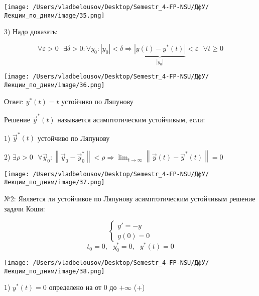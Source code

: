 \documentclass[12pt, a4paper]{report}
\begin{document}
\begin{center}
    \texttt{[image: /Users/vladbelousov/Desktop/Semestr\_4-FP-NSU/ДфУ/Лекции\_по\_дням/image/35.png]}
\end{center}

3) Надо доказать: 

\[ \forall  \varepsilon > 0 \text{ }  \exists  \delta > 0 : \forall  y_0 : \left\lvert y_0  \right\rvert < \delta \Rightarrow\underbrace{ \left\lvert  y(t) - y^* (t )  \right\rvert}_{|y_0|} < \varepsilon \text{ } \forall  t \ge 0 \] 

\begin{center}
    \texttt{[image: /Users/vladbelousov/Desktop/Semestr\_4-FP-NSU/ДфУ/Лекции\_по\_дням/image/36.png]}
\end{center}

Ответ: \( y^* (t ) = t  \)  устойчиво по Ляпунову

\begin{definition}
    Решение \( \vec{y } ^* (t )  \) называется асимптотическим устойчивым, если: 

    1) \( \vec{y } ^* (t )  \) устойчиво по Ляпунову 

    2) \( \exists  \rho > 0 \text{ }  \forall  \vec{y } _0 : \left\lVert \vec{y } _ 0 - \vec{y }  ^* _0  \right\rVert < \rho \displaystyle \Rightarrow \lim_{t     \to \infty} \left\lVert \vec{y } (t ) - \vec{y}  ^* (t ) \right\rVert = 0  \) 

    \begin{center}
        \texttt{[image: /Users/vladbelousov/Desktop/Semestr\_4-FP-NSU/ДфУ/Лекции\_по\_дням/image/37.png]}
    \end{center}
\end{definition}

№2: Является ли устойчивое по Ляпунову асимптотическим устойчивым решение задачи Коши: 

\[ \begin{cases}
y ' = - y \\ 
y(0 )=  0
\end{cases} \] 
\[ t_0 = 0 , \text{ }  y_0 ^{* }  = 0  , \text{ }  y^{* }  (t ) = 0 \] 

\begin{center}
    \texttt{[image: /Users/vladbelousov/Desktop/Semestr\_4-FP-NSU/ДфУ/Лекции\_по\_дням/image/38.png]}
\end{center}

1) \( y^{* } (t ) = 0  \) определено на от \(  0 \)  до \( + \infty  \) (+)
\end{document}

